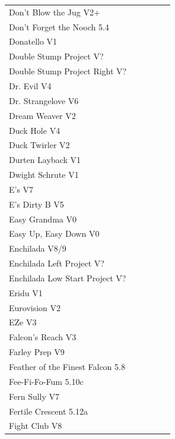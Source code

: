 \begin{flushleft}
\begin{center}
\begin{supertabular}{p{0.76\linewidth}p{0.08\linewidth}}
Don't Blow the Jug V2+ & \pageref{rt:Don't Blow the Jug} \\
Don't Forget the Nooch 5.4 & \pageref{rt:Don't Forget the Nooch} \\
Donatello V1 & \pageref{rt:Donatello} \\
Double Stump Project V? & \pageref{rt:Double Stump Project} \\
Double Stump Project Right V? & \pageref{vr:Double Stump Project Right} \\
Dr. Evil V4 & \pageref{rt:Dr. Evil} \\
Dr. Strangelove V6 & \pageref{rt:Dr. Strangelove} \\
Dream Weaver V2 & \pageref{vr:Dream Weaver} \\
Duck Hole V4 & \pageref{rt:DT 1} \\
Duck Twirler V2 & \pageref{rt:Duck Twirler} \\
Durten Layback V1 & \pageref{rt:Durten Layback} \\
Dwight Schrute V1 & \pageref{rt:Dwight Schrute} \\
E's V7 & \pageref{rt:E's} \\
E's Dirty B V5 & \pageref{rt:E's Dirty B} \\
Easy Grandma V0 & \pageref{rt:Easy Grandma} \\
Easy Up, Easy Down V0 & \pageref{rt:Easy Up, Easy Down} \\
Enchilada V8/9 & \pageref{rt:Enchilada} \\
Enchilada Left Project V? & \pageref{vr:Enchilada Left Project} \\
Enchilada Low Start Project V? & \pageref{vr:Enchilada Low Start Project} \\
Eridu V1 & \pageref{rt:Eridu} \\
Eurovision V2 & \pageref{rt:Eurovision} \\
EZe V3 & \pageref{vr:EZe} \\
Falcon's Reach V3 & \pageref{rt:Falcon's Reach} \\
Farley Prep V9 & \pageref{rt:Farley Prep} \\
Feather of the Finest Falcon 5.8 & \pageref{rt:Feather of the Finest Falcon} \\
Fee-Fi-Fo-Fum 5.10c & \pageref{rt:Fee-Fi-Fo-Fum} \\
Fern Sully V7 & \pageref{rt:Fern Sully} \\
Fertile Crescent 5.12a & \pageref{rt:Fertile Crescent} \\
Fight Club V8 & \pageref{rt:Fight Club} \\

\end{supertabular}
\end{center}
\end{flushleft}
